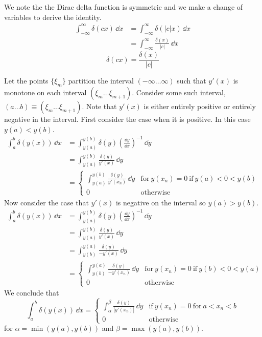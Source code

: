 {\begin{Solution}
  \label{solution d(cx)=d(x)/c}
  We note the the Dirac delta function is symmetric and we make a change of
  variables to derive the identity.
  \begin{align*}
    \int_{-\infty}^\infty \delta(c x)\,\dd x 
    &= \int_{-\infty}^\infty \delta(|c| x)\,\dd x 
    \\
    &= \int_{-\infty}^\infty \frac{\delta(x)}{|c|}\,\dd x 
  \end{align*}
  \[ 
  \boxed{
    \delta(c x) = \frac{\delta(x)}{|c|}
    }
  \]
\end{Solution}







\begin{Solution}
  \label{solution dcx=1cdx}
  Let the points $\{ \xi_m \}$ partition the interval $(-\infty \ldots \infty)$ such that $y'(x)$
  is monotone on each interval $(\xi_m \ldots \xi_{m+1})$.  Consider some such interval,
  $(a \ldots b) \equiv (\xi_m \ldots \xi_{m+1})$.  Note that $y'(x)$ is either 
  entirely positive or entirely negative in the interval.  First consider 
  the case when it is positive.  In this case $y(a) < y(b)$.
  \begin{align*}
    \int_a^b \delta(y(x))\,\dd x
    &= \int_{y(a)}^{y(b)} \delta(y) \left( \frac{\dd y}{\dd x} \right)^{-1} \,\dd y 
    \\
    &= \int_{y(a)}^{y(b)} \frac{\delta(y)}{y'(x)}\,\dd y 
    \\
    &= \begin{cases}
      \int_{y(a)}^{y(b)} \frac{\delta(y)}{y'(x_n)}\,\dd y &\mathrm{for}\ y(x_n) = 0\ 
      \mathrm{if}\ y(a) < 0 < y(b) \\
      0 &\mathrm{otherwise}
    \end{cases}
  \end{align*}
  Now consider the case that $y'(x)$ is negative on the interval so 
  $y(a) > y(b)$.
  \begin{align*}
    \int_a^b \delta(y(x))\,\dd x
    &= \int_{y(a)}^{y(b)} \delta(y) \left( \frac{\dd y}{\dd x} \right)^{-1} \,\dd y 
    \\
    &= \int_{y(a)}^{y(b)} \frac{\delta(y)}{y'(x)}\,\dd y 
    \\
    &= \int_{y(b)}^{y(a)} \frac{\delta(y)}{-y'(x)}\,\dd y 
    \\
    &= \begin{cases}
      \int_{y(b)}^{y(a)} \frac{\delta(y)}{-y'(x_n)}\,\dd y &\mathrm{for}\ y(x_n) = 0\ 
      \mathrm{if}\ y(b) < 0 < y(a) \\
      0 &\mathrm{otherwise}
    \end{cases}
  \end{align*}
  We conclude that
  \[
  \int_a^b \delta(y(x))\,\dd x
  = \begin{cases}
    \int_\alpha^\beta \frac{\delta(y)}{|y'(x_n)|}\,\dd y &\mathrm{if}\ y(x_n) = 0\ 
    \mathrm{for}\ a < x_n < b \\
    0 &\mathrm{otherwise}
  \end{cases}
  \]
  for $\alpha = \min(y(a),y(b))$ and $\beta = \max(y(a),y(b))$.


\end{Solution}}
